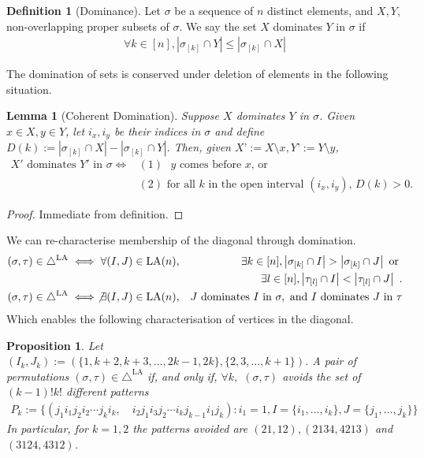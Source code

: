 \documentclass{amsart}
\newcommand{\Kurt}[1]{\todo[color=orange!30]{\rm #1 \\ \hfill --- K.}}
\newtheorem{proposition}[theorem]{Proposition}
\newtheorem{lemma}[theorem]{Lemma}
\theoremstyle{definition}
\newtheorem{definition}[theorem]{Definition}
\newcommand{\LA}{\mathrm{LA}}
\newcommand{\LAD}{\triangle^{\mathrm{LA}}}
\begin{document}
\Kurt{Maybe through dominance?}

\begin{definition}[Dominance]
Let $\sigma$ be a sequence of $n$ distinct elements, and $X,Y$, non-overlapping proper subsets of $\sigma$.
We say the set $X$ dominates $Y$ in $\sigma$ if 
\begin{align*}
    \forall k \in [n] , 
    \left| \sigma_{[k]} \cap Y \right|
    \leq
    \left| \sigma_{[k]} \cap X \right|
\end{align*}
\end{definition}
The domination of sets is conserved under deletion of elements in the following situation. 
\begin{lemma}[Coherent Domination]\label{lem:Coherent Domination}
Suppose $X$ dominates $Y$ in $\sigma$. 
Given $x \in X, y\in Y$, let $i_x,i_y$ be their indices in $\sigma$ and define $D(k) :=  \left| \sigma_{[k]} \cap X \right| -  \left| \sigma_{[k]} \cap Y \right|$.
Then, given $X’ := X\setminus x, Y’:= Y\setminus y$,
\begin{align*}
    X' \text{ dominates } Y' \text{ in } \sigma \iff &(1) \text{ $y$ comes before $x$, or}\\
    &(2) \text{ for all $k$ in the open interval $(i_x,i_y)$, $D(k) > 0$.} 
\end{align*}
\end{lemma}
\begin{proof}
Immediate from definition.
\end{proof}
We can re-characterise membership of the diagonal through domination.
\begin{eqnarray*}
    (\sigma,\tau)\in \LAD 
    & \iff \forall (I,J) \in \LA(n), &\exists k \in [n] , 
    \left| \sigma_{[k]} \cap I \right|
    >
    \left| \sigma_{[k]} \cap J \right| \text{ or } \\
    && \exists l \in [n] , 
    \left| \tau_{[l]} \cap I \right|
    <
    \left| \tau_{[l]} \cap J \right|  \ . \\
    (\sigma,\tau) \in \LAD & \iff \not \exists (I,J) \in \LA(n), & J \text{ dominates } I \text{ in } \sigma, \text{ and } I \text{ dominates } J \text{ in } \tau
\end{eqnarray*}
Which enables the following characterisation of vertices in the diagonal.

\begin{proposition}\label{prop: LAD Fish Pattern}
Let $(I_k,J_k):= (\{1,k+2,k+3,\dots,2k-1,2k\}, \{2,3,\dots,k+1\})$.
A pair of permutations $(\sigma,\tau)\in \LAD$ if, and only if, $\forall k,$ $(\sigma,\tau)$ avoids the set of $(k-1)!k!$ different patterns
\begin{align*}
    P_k:= \{ (j_1 i_1 j_2 i_2 \cdots j_k i_k,\quad  i_2 j_1 i_3 j_2 \cdots i_k j_{k-1} i_1 j_k): i_1 = 1, I = \{i_1,...,i_k\},J = \{j_1,...,j_k\} \}
\end{align*}
In particular, for $k=1,2$ the patterns avoided are $(21,12),(2134,4213)$ and $(3124,4312)$.
\end{proposition}
\end{document}
